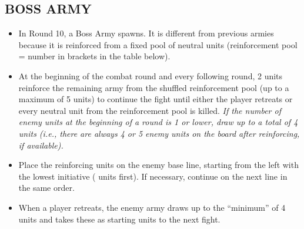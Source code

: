 \begin{multicols}{2}
\subsection*{\MakeUppercase{Boss Army}}

\begin{itemize}
  \item In Round 10, a Boss Army spawns. It is different from previous armies because it is reinforced from a fixed pool of neutral units (reinforcement pool = number in brackets in the table below).
  \item At the beginning of the  combat round and every following round, 2 units reinforce the remaining army from the shuffled reinforcement pool (up to a maximum of 5 units) to continue the fight until either the player retreats or every neutral unit from the reinforcement pool is killed. \textit{If the number of enemy units at the beginning of a round is 1 or lower, draw up to a total of 4 units (i.e., there are always 4 or 5 enemy units on the board after reinforcing, if available).}
  \item Place the reinforcing units on the enemy base line, starting from the left with the lowest initiative ( units first). If necessary, continue on the next line in the same order.
  \item When a player retreats, the enemy army draws up to the ``minimum'' of 4 units and takes these as starting units to the next fight.
\end{itemize}

\columnbreak

\vspace*{\fill}

\end{multicols}


\vspace*{\fill}

